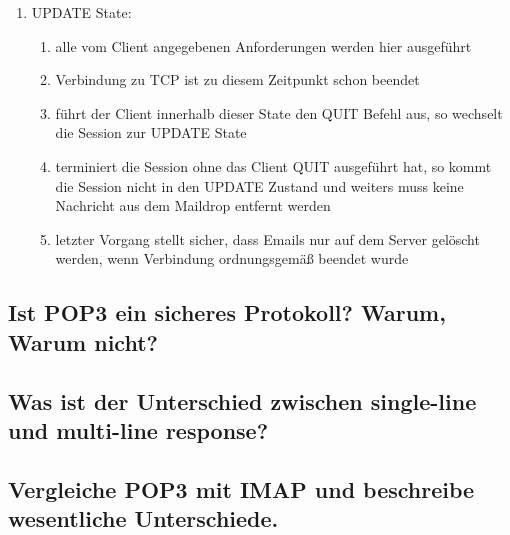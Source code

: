 \documentclass[11pt]{article}
\begin{document}
\begin{enumerate}
        \item UPDATE State:
        \begin{enumerate}
            \item alle vom Client angegebenen Anforderungen werden hier ausgeführt
            \item Verbindung zu TCP ist zu diesem Zeitpunkt schon beendet
            \item führt der Client innerhalb dieser State den QUIT Befehl aus, so
            wechselt die Session zur UPDATE State
            \item terminiert die Session ohne das Client QUIT ausgeführt hat, so kommt
            die Session nicht in den UPDATE Zustand und weiters muss keine Nachricht
            aus dem Maildrop entfernt werden
            \item letzter Vorgang stellt sicher, dass Emails nur auf dem Server gelöscht werden,
            wenn Verbindung ordnungsgemäß beendet wurde
        \end{enumerate}
    \end{enumerate}
    \subsection{Ist POP3 ein sicheres Protokoll? Warum, Warum nicht?}

    \subsection{Was ist der Unterschied zwischen single-line und multi-line response?}

    \subsection{Vergleiche POP3 mit IMAP und beschreibe wesentliche Unterschiede.}
\end{document}
